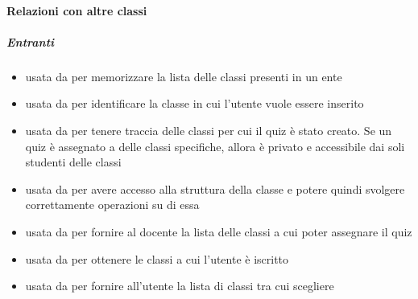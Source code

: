 \paragraph{Relazioni con altre classi}
\subparagraph{Entranti}
\begin{itemize}
\item usata da  per memorizzare la lista
delle classi presenti in un ente
\item usata da  per identificare la classe
in cui l'utente vuole essere inserito
\item usata da  per tenere traccia delle classi per
cui il quiz è stato creato. Se un quiz è assegnato a delle classi specifiche, allora è privato e
accessibile dai soli studenti delle classi
\item usata da  per avere
accesso alla struttura della classe e potere quindi svolgere correttamente operazioni su di
essa
\item usata da  per fornire al docente la lista delle classi a cui poter assegnare il quiz
\item usata da  per ottenere le classi a cui l'utente è iscritto
\item usata da  per fornire all'utente la lista di classi tra cui scegliere
\end{itemize}
